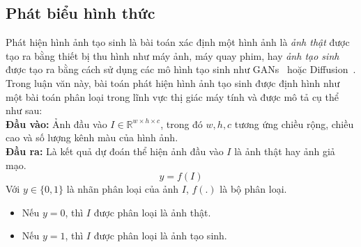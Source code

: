 \subsection{Phát biểu hình thức}
%
Phát hiện hình ảnh tạo sinh là bài toán xác định một hình ảnh là \textit{ảnh thật} được tạo ra bằng thiết bị thu hình như máy ảnh, máy quay phim, hay \textit{ảnh tạo sinh} được tạo ra bằng cách sử dụng các mô hình tạo sinh như GANs~\cite{Goodfellow2014GenerativeAN} hoặc Diffusion~\cite{Ho2020DenoisingDP}. Trong luận văn này, bài toán phát hiện hình ảnh tạo sinh được định hình như một bài toán phân loại trong lĩnh vực thị giác máy tính và được mô tả cụ thể như sau:\\
%
\textbf{Đầu vào:} Ảnh đầu vào $I \in \mathbb{R}^{w \times h \times c}$, trong đó $w ,h, c$ tương ứng chiều rộng, chiều cao và số lượng kênh màu của hình ảnh.\\
%
\textbf{Đầu ra: } Là kết quả dự đoán thể hiện ảnh đầu vào $I$ là ảnh thật hay ảnh giả mạo.
\begin{equation}
y = f(I)
\end{equation}
Với  \( y \in \{0, 1\} \) là nhãn phân loại của ảnh \( I \), $f(.)$ là bộ phân loại.
\begin{itemize}
    \item Nếu \( y = 0 \), thì \( I \) được phân loại là ảnh thật.
    \item Nếu \( y = 1 \), thì \( I \) được phân loại là ảnh tạo sinh.
\end{itemize}
%
%
